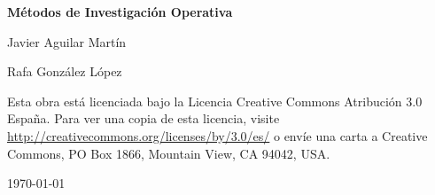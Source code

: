 \documentclass[twoside]{report}
\begin{document}
\begin{titlepage}
	\centering
	{\huge\bfseries Métodos de Investigación Operativa \par}
	\vspace{2cm}
	{\Large Javier Aguilar Martín\par}
	{\Large Rafa González López\par}
	\vspace{2.5cm}
	\vfill
	Esta obra está licenciada bajo la Licencia Creative Commons Atribución 3.0 España. Para ver una copia de esta licencia, visite \url{http://creativecommons.org/licenses/by/3.0/es/} o envíe una carta a Creative Commons, PO Box 1866, Mountain View, CA 94042, USA.

	{\large \today\par}
\end{titlepage}

\tableofcontents


%
%
%
%
%
%
\end{document}
